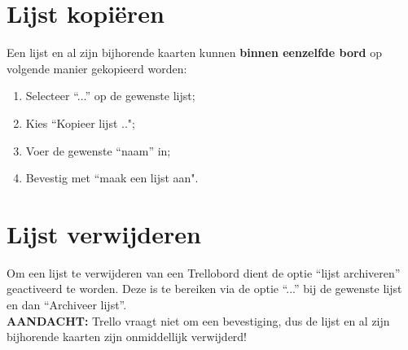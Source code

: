 \section{Lijst kopi\"eren}

Een lijst en al zijn bijhorende kaarten kunnen \textbf{binnen eenzelfde bord} op volgende manier gekopieerd worden:
\begin{enumerate}[nolistsep]
	\item Selecteer ``...'' op de gewenste lijst;
	\item Kies ``Kopieer lijst ..";
	\item Voer de gewenste ``naam'' in;
	\item Bevestig met ``maak een lijst aan".
\end{enumerate}

\section{Lijst verwijderen}

Om een lijst te verwijderen van een Trellobord dient de optie ``lijst archiveren'' geactiveerd te worden. Deze is te bereiken via de optie ``...'' bij de gewenste lijst en dan ``Archiveer lijst''.\\
 \textbf{AANDACHT:} Trello vraagt niet om een bevestiging, dus de lijst en al zijn bijhorende kaarten zijn onmiddellijk verwijderd!